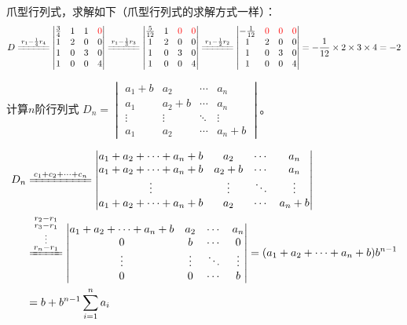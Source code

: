 \documentclass[a4paper]{report}
\begin{document}
\begin{jie}
爪型行列式，求解如下（爪型行列式的求解方式一样）：
\begin{align*}
D\xlongequal{r_1-\frac{1}{4}r_4}
\begin{vmatrix}
\frac{3}{4}&1&1&\textcolor[rgb]{1.00,0.00,0.00}{0}\\
1&2&0&0\\
1&0&3&0\\
1&0&0&4
\end{vmatrix}\xlongequal{r_1-\frac{1}{3}r_3}
\begin{vmatrix}
\frac{5}{12}&1&\textcolor[rgb]{1.00,0.00,0.00}{0}&\textcolor[rgb]{1.00,0.00,0.00}{0}\\
1&2&0&0\\
1&0&3&0\\
1&0&0&4
\end{vmatrix}\xlongequal{r_1-\frac{1}{2}r_2}
\begin{vmatrix}
-\frac{1}{12}&\textcolor[rgb]{1.00,0.00,0.00}{0}&\textcolor[rgb]{1.00,0.00,0.00}{0}&\textcolor[rgb]{1.00,0.00,0.00}{0}\\
1&2&0&0\\
1&0&3&0\\
1&0&0&4
\end{vmatrix}=-\frac{1}{12}\times 2\times 3\times4=-2
\end{align*}
\end{jie}

\EX 计算$n$阶行列式
$D_{n}
=\begin{vmatrix}
a_1+b&a_2&\cdots&a_{n}\\
a_1&a_2+b&\cdots&a_{n}\\
\vdots&\vdots&\ddots&\vdots\\
a_1&a_2&\cdots&a_{n}+b
 \end{vmatrix}
$。

\begin{jie}
\begin{align*}
D_{n}&\xlongequal{c_1+c_2+\cdots+c_n}
\begin{vmatrix}
a_1+a_2+\cdots+a_{n}+b&a_2&\cdots&a_{n}\\
a_1+a_2+\cdots+a_{n}+b&a_2+b&\cdots&a_{n}\\
\vdots&\vdots&\ddots&\vdots\\
a_1+a_2+\cdots+a_{n}+b&a_2&\cdots&a_{n}+b
 \end{vmatrix}\\
 &\xlongequal{\substack{r_2-r_1\\ r_3-r_1\\ \vdots\\r_n-r_1}}
 \begin{vmatrix}
a_1+a_2+\cdots+a_{n}+b&a_2&\cdots&a_{n}\\
0&b&\cdots&0\\
\vdots&\vdots&\ddots&\vdots\\
0&0&\cdots&b
 \end{vmatrix}=(a_1+a_2+\cdots+a_{n}+b)b^{n-1}\\
 &=b+b^{n-1}\sum_{i=1}^{n}a_i
\end{align*}
\end{jie}
\end{document}
